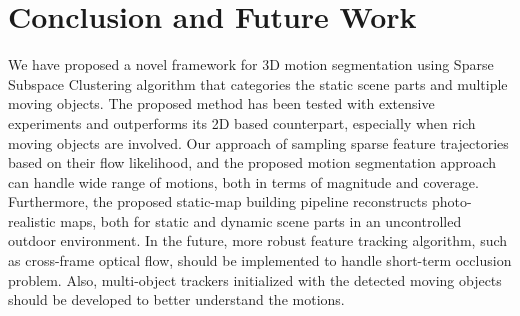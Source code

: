 \documentclass[10pt,twocolumn,letterpaper]{article}  %
\begin{document}
\section{Conclusion and Future Work}

We have proposed a novel framework for 3D motion segmentation using Sparse Subspace Clustering algorithm that categories the static scene parts and multiple moving objects. The proposed method has been tested with extensive experiments and outperforms its 2D based counterpart, especially when rich moving objects are involved. Our approach of sampling sparse feature trajectories based on their flow likelihood, and the proposed motion segmentation approach can handle wide range of motions, both in terms of magnitude and coverage. Furthermore, the proposed static-map building pipeline reconstructs photo-realistic maps, both for static and dynamic scene parts in an uncontrolled outdoor environment. In the future, more robust feature tracking algorithm, such as cross-frame optical flow, should be implemented to handle short-term occlusion problem. Also, multi-object trackers initialized with the detected moving objects should be developed to better understand the motions.









\end{document}
